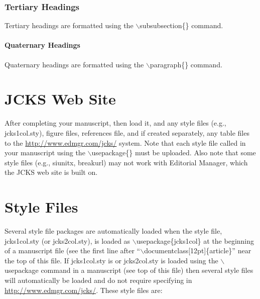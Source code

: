 \documentclass[12pt]{article}
\begin{document}
\subsubsection{Tertiary Headings}
Tertiary headings are formatted using the $\backslash$subsubsection\{\} command.

\paragraph{Quaternary Headings}
Quaternary headings are formatted using the $\backslash$paragraph\{\} command.

\section{JCKS Web Site}
After completing your manuscript, then load it, and any style files (e.g., jcks1col.sty), figure files, references file, and if created separately, any table files to the \url{http://www.edmgr.com/jcks/} system.  Note that each style file called in your manuscript using the $\backslash$usepackage\{\} must be uploaded.  Also note that some style files (e.g., siunitx, breakurl) may not work with Editorial Manager, which the JCKS web site is built on.

\section{Style Files}
Several style file packages are automatically loaded when the style file, jcks1col.sty (or jcks2col.sty), is loaded as $\backslash$usepackage\{jcks1col\} at the beginning of a manuscript file (see the first line after ``$\backslash$documentclass[12pt]\{article\}'' near the top of this file.  If jcks1col.sty is or jcks2col.sty is loaded using the $\backslash$usepackage command in a manuscript (see top of this file) then several style files will automatically be loaded and do not require specifying in \url{http://www.edmgr.com/jcks/}.  These style files are:
\end{document}
